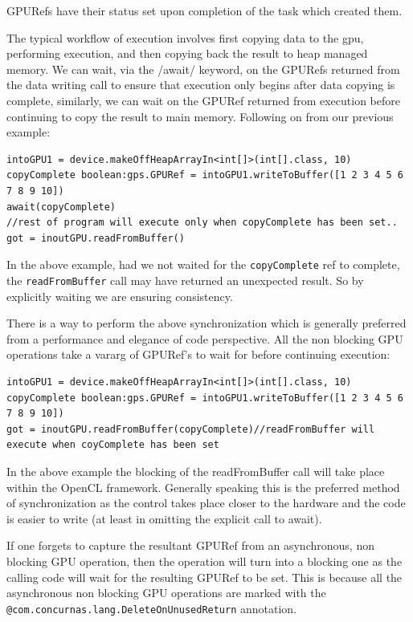 \documentclass[conc-doc]{subfiles}
\begin{document}
GPURefs have their status set upon completion of the task which created them.

The typical workflow of execution involves first copying data to the gpu, performing execution, and then copying back the result to heap managed memory. We can wait, via the /await/ keyword, on the GPURefs returned from the data writing call to ensure that execution only begins after data copying is complete, similarly, we can wait on the GPURef returned from execution before continuing to copy the result to main memory. Following on from our previous example:

\begin{lstlisting}
intoGPU1 = device.makeOffHeapArrayIn<int[]>(int[].class, 10)
copyComplete boolean:gps.GPURef = intoGPU1.writeToBuffer([1 2 3 4 5 6 7 8 9 10])
await(copyComplete)
//rest of program will execute only when copyComplete has been set..
got = inoutGPU.readFromBuffer()
\end{lstlisting}

In the above example, had we not waited for the \lstinline{copyComplete} ref to complete, the \lstinline{readFromBuffer} call may have returned an unexpected result. So by explicitly waiting we are ensuring consistency.

There is a way to perform the above synchronization which is generally preferred from a performance and elegance of code perspective. All the non blocking GPU operations take a vararg of GPURef's to wait for before continuing execution:

\begin{lstlisting}
intoGPU1 = device.makeOffHeapArrayIn<int[]>(int[].class, 10)
copyComplete boolean:gps.GPURef = intoGPU1.writeToBuffer([1 2 3 4 5 6 7 8 9 10])
got = inoutGPU.readFromBuffer(copyComplete)//readFromBuffer will execute when coyComplete has been set
\end{lstlisting}

In the above example the blocking of the readFromBuffer call will take place within the OpenCL framework. Generally speaking this is the preferred method of synchronization as the control takes place closer to the hardware and the code is easier to write (at least in omitting the explicit call to await).

If one forgets to capture the resultant GPURef from an asynchronous, non blocking GPU operation, then the operation will turn into a blocking one as the calling code will wait for the resulting GPURef to be set. This is because all the asynchronous non blocking GPU operations are marked with the \lstinline{@com.concurnas.lang.DeleteOnUnusedReturn} annotation.
\end{document}
